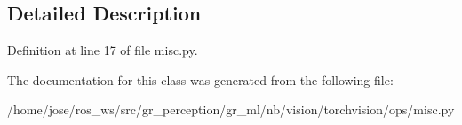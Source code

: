 \subsection{Detailed Description}


Definition at line 17 of file misc.\+py.



The documentation for this class was generated from the following file\+:\begin{DoxyCompactItemize}
\item 
/home/jose/ros\+\_\+ws/src/gr\+\_\+perception/gr\+\_\+ml/nb/vision/torchvision/ops/misc.\+py\end{DoxyCompactItemize}
